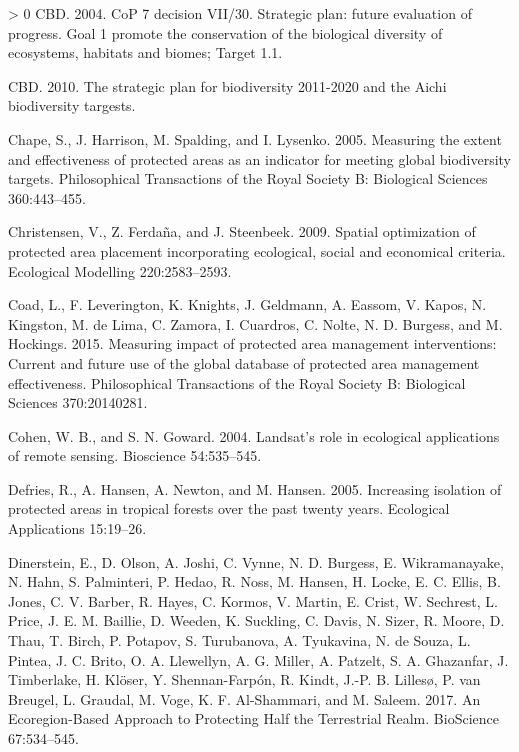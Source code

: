 \documentclass[10pt,oneside]{article}
\newlength{\cslhangindent}
\newenvironment{CSLReferences}[3] %
 {%
  \setlength{\parindent}{0pt}
  \ifodd #1 \everypar{\setlength{\hangindent}{\cslhangindent}}\ignorespaces\fi
  \ifnum #2 > 0
  \setlength{\parskip}{#2\baselineskip}
  \fi
 }%
 {}
\begin{document}
\begin{CSLReferences}{1}{0}
\leavevmode\hypertarget{ref-cbd2004}{}%
CBD. 2004. CoP 7 decision VII/30. Strategic plan: future evaluation of
progress. Goal 1 promote the conservation of the biological diversity of
ecosystems, habitats and biomes; Target 1.1.

\leavevmode\hypertarget{ref-cbd2010}{}%
CBD. 2010. The strategic plan for biodiversity 2011-2020 and the Aichi
biodiversity targests.

\leavevmode\hypertarget{ref-chapeMeasuringExtentEffectiveness2005}{}%
Chape, S., J. Harrison, M. Spalding, and I. Lysenko. 2005. Measuring the
extent and effectiveness of protected areas as an indicator for meeting
global biodiversity targets. Philosophical Transactions of the Royal
Society B: Biological Sciences 360:443--455.

\leavevmode\hypertarget{ref-christensen2009}{}%
Christensen, V., Z. Ferdaña, and J. Steenbeek. 2009. Spatial
optimization of protected area placement incorporating ecological,
social and economical criteria. Ecological Modelling 220:2583--2593.

\leavevmode\hypertarget{ref-coadMeasuringImpactProtected2015}{}%
Coad, L., F. Leverington, K. Knights, J. Geldmann, A. Eassom, V. Kapos,
N. Kingston, M. de Lima, C. Zamora, I. Cuardros, C. Nolte, N. D.
Burgess, and M. Hockings. 2015. Measuring impact of protected area
management interventions: Current and future use of the global database
of protected area management effectiveness. Philosophical Transactions
of the Royal Society B: Biological Sciences 370:20140281.

\leavevmode\hypertarget{ref-cohen2004}{}%
Cohen, W. B., and S. N. Goward. 2004. Landsat's role in ecological
applications of remote sensing. Bioscience 54:535--545.

\leavevmode\hypertarget{ref-defries2005}{}%
Defries, R., A. Hansen, A. Newton, and M. Hansen. 2005. Increasing
isolation of protected areas in tropical forests over the past twenty
years. Ecological Applications 15:19--26.

\leavevmode\hypertarget{ref-dinersteinEcoregionBasedApproachProtecting2017}{}%
Dinerstein, E., D. Olson, A. Joshi, C. Vynne, N. D. Burgess, E.
Wikramanayake, N. Hahn, S. Palminteri, P. Hedao, R. Noss, M. Hansen, H.
Locke, E. C. Ellis, B. Jones, C. V. Barber, R. Hayes, C. Kormos, V.
Martin, E. Crist, W. Sechrest, L. Price, J. E. M. Baillie, D. Weeden, K.
Suckling, C. Davis, N. Sizer, R. Moore, D. Thau, T. Birch, P. Potapov,
S. Turubanova, A. Tyukavina, N. de Souza, L. Pintea, J. C. Brito, O. A.
Llewellyn, A. G. Miller, A. Patzelt, S. A. Ghazanfar, J. Timberlake, H.
Klöser, Y. Shennan-Farpón, R. Kindt, J.-P. B. Lillesø, P. van Breugel,
L. Graudal, M. Voge, K. F. Al-Shammari, and M. Saleem. 2017. An
Ecoregion-Based Approach to Protecting Half the Terrestrial Realm.
BioScience 67:534--545.


\end{CSLReferences}
\end{document}
